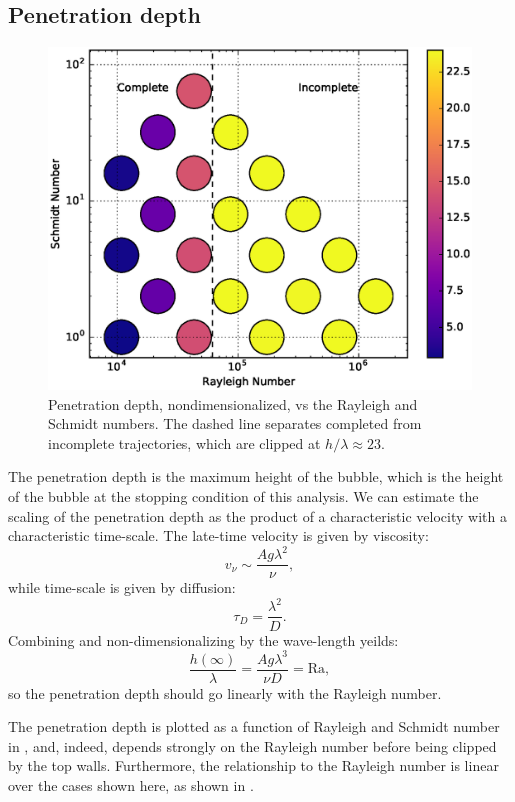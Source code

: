 \subsection{Penetration depth}
\begin{figure}
\includegraphics[width=\columnwidth]{figs/PenetrationDepth-vs-Rayleigh-Schmidt}
\caption{ 
  Penetration depth, nondimensionalized, vs the Rayleigh and Schmidt numbers.
  The dashed line separates completed from incomplete trajectories, which are clipped at $h/\lambda \approx 23$.
}
\end{figure}

The penetration depth is the maximum height of the bubble, which is the height of the bubble at the stopping condition of this analysis.
We can estimate the scaling of the penetration depth as the product of a characteristic velocity with a characteristic time-scale.
The late-time velocity is given by viscosity:
\begin{equation}
v_\nu \sim \frac{ A g \lambda^2}{\nu},
\end{equation}
while time-scale is given by diffusion:
\begin{equation}
\tau_D = \frac{\lambda^2}{D}.
\end{equation}
Combining and non-dimensionalizing by the wave-length yeilds:
\begin{equation}
\frac{h(\infty)}{\lambda} = \frac{A g \lambda^3}{\nu D} = \text{Ra},
\end{equation}
so the penetration depth should go linearly with the Rayleigh number.

The penetration depth is plotted as a function of Rayleigh and Schmidt number in , and, indeed, depends strongly on the Rayleigh number before being clipped by the top walls.
Furthermore, the relationship to the Rayleigh number is linear over the cases shown here, as shown in .

